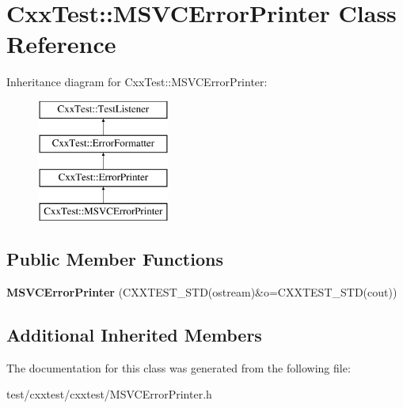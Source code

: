 \hypertarget{classCxxTest_1_1MSVCErrorPrinter}{\section{Cxx\-Test\-:\-:M\-S\-V\-C\-Error\-Printer Class Reference}
\label{classCxxTest_1_1MSVCErrorPrinter}
}
Inheritance diagram for Cxx\-Test\-:\-:M\-S\-V\-C\-Error\-Printer\-:\begin{figure}[H]
\begin{center}
\leavevmode
\includegraphics[height=4.000000cm]{classCxxTest_1_1MSVCErrorPrinter}
\end{center}
\end{figure}
\subsection*{Public Member Functions}
\begin{DoxyCompactItemize}
\item 
\hypertarget{classCxxTest_1_1MSVCErrorPrinter_a9140f8cfef1c6d61429789300c230d08}{{\bfseries M\-S\-V\-C\-Error\-Printer} (C\-X\-X\-T\-E\-S\-T\-\_\-\-S\-T\-D(ostream)\&o=C\-X\-X\-T\-E\-S\-T\-\_\-\-S\-T\-D(cout))}\label{classCxxTest_1_1MSVCErrorPrinter_a9140f8cfef1c6d61429789300c230d08}

\end{DoxyCompactItemize}
\subsection*{Additional Inherited Members}


The documentation for this class was generated from the following file\-:\begin{DoxyCompactItemize}
\item 
test/cxxtest/cxxtest/M\-S\-V\-C\-Error\-Printer.\-h\end{DoxyCompactItemize}
